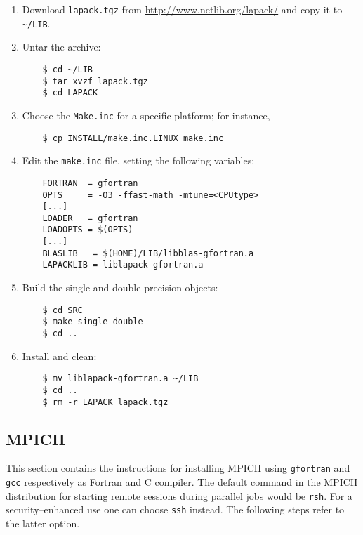 \documentclass[a4paper,12pt]{article}%
\begin{document}
\begin{enumerate}
\item Download \verb+lapack.tgz+ from
  \url{http://www.netlib.org/lapack/} and copy it to \verb+~/LIB+.
\item Untar the archive:
  \begin{Verbatim}
    $ cd ~/LIB
    $ tar xvzf lapack.tgz
    $ cd LAPACK
  \end{Verbatim}
\item Choose the \verb+Make.inc+ for a specific platform; for instance,
  \begin{Verbatim}
    $ cp INSTALL/make.inc.LINUX make.inc
  \end{Verbatim}
\item Edit the \verb+make.inc+ file, setting the following variables:
  \begin{Verbatim}
    FORTRAN  = gfortran
    OPTS     = -O3 -ffast-math -mtune=<CPUtype>
    [...]
    LOADER   = gfortran
    LOADOPTS = $(OPTS)
    [...]
    BLASLIB   = $(HOME)/LIB/libblas-gfortran.a
    LAPACKLIB = liblapack-gfortran.a
  \end{Verbatim}
\item Build the single and double precision objects:
  \begin{Verbatim}
    $ cd SRC
    $ make single double
    $ cd ..
  \end{Verbatim}
\item Install and clean:
  \begin{Verbatim}
    $ mv liblapack-gfortran.a ~/LIB
    $ cd ..
    $ rm -r LAPACK lapack.tgz
  \end{Verbatim}
\end{enumerate}

\subsection{MPICH}

This section contains the instructions for installing MPICH using
\verb+gfortran+ and \verb+gcc+ respectively as Fortran and C
compiler. The default command in the MPICH distribution for starting
remote sessions during parallel jobs would be \verb+rsh+. For a
security--enhanced use one can choose \verb+ssh+ instead. The
following steps refer to the latter option.
\end{document}
